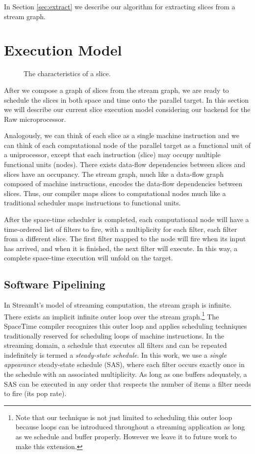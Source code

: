 In Section \ref{sec:extract} we describe our algorithm for extracting
slices from a stream graph.

\section{Execution Model}
\begin{figure}[t]
\centering
{}
\caption{The characteristics of a slice.
\protect\label{fig:slice}}
\end{figure}

After we compose a graph of slices from the stream graph, we are ready
to schedule the slices in both space and time onto the parallel
target.  In this section we will describe our current slice execution
model considering our backend for the Raw microprocessor.

Analogously, we can think of each slice as a single machine
instruction and we can think of each computational node of the
parallel target as a functional unit of a uniprocessor, except that
each instruction (slice) may occupy multiple functional units
(nodes). There exists data-flow dependencies between slices and slices
have an occupancy.  The stream graph, much like a data-flow graph
composed of machine instructions, encodes the data-flow dependencies
between slices. Thus, our compiler maps slices to computational nodes
much like a traditional scheduler maps instructions to functional
units.

After the space-time scheduler is completed, each computational node
will have a time-ordered list of filters to fire, with a multiplicity
for each filter, each filter from a different slice.  The first
filter mapped to the node will fire when its input has arrived, and
when it is finished, the next filter will execute.  In this way, a
complete space-time execution will unfold on the target.

\subsection{Software Pipelining}
\label{sec:softpipe}
In StreamIt's model of streaming computation, the stream graph is
infinite.  There exists an implicit infinite outer loop over the
stream graph.\footnote{Note that our technique is not just limited to
scheduling this outer loop because loops can be introduced throughout
a streaming application as long as we schedule and buffer properly.
However we leave it to future work to make this extension.}  The
SpaceTime compiler recognizes this outer loop and applies scheduling
techniques traditionally reserved for scheduling loops of machine
instructions.  In the streaming domain, a schedule that executes all
filters and can be repeated indefinitely is termed a {\it steady-state
schedule}.  In this work, we use a {\it single appearance}
steady-state schedule (SAS), where each filter occurs exactly once in
the schedule with an associated multiplicity.  As long as one buffers
adequately, a SAS can be executed in any order that respects the
number of items a filter needs to fire (its pop rate).

